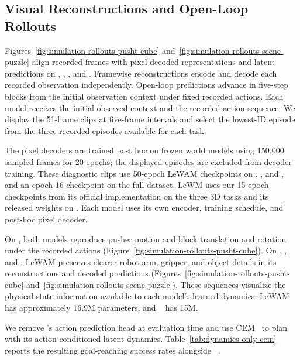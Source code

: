 \subsection{Visual Reconstructions and Open-Loop Rollouts}
\label{app:simulation-rollouts}

Figures~\ref{fig:simulation-rollouts-pusht-cube}
and~\ref{fig:simulation-rollouts-scene-puzzle} align recorded frames with
pixel-decoded representations and latent predictions on
, , , and .
Framewise reconstructions encode and decode each recorded observation independently. Open-loop predictions advance in five-step blocks from the initial observation context under fixed recorded actions. Each model receives the initial observed context and the recorded action sequence. We display the 51-frame clips at five-frame intervals and select the lowest-ID episode from the three recorded episodes available for each task.

The pixel decoders are trained post hoc on frozen world models using 150{,}000
sampled frames for 20 epochs; the displayed episodes are excluded from decoder
training. These diagnostic clips use 50-epoch LeWAM checkpoints on
, , and , and an epoch-16 checkpoint
on the full  dataset. LeWM uses our 15-epoch checkpoints from its
official implementation on the three 3D tasks and its released weights on
. Each model uses its own encoder, training schedule, and post-hoc pixel decoder.

On , both models reproduce pusher motion and block translation and rotation under the recorded actions (Figure~\ref{fig:simulation-rollouts-pusht-cube}). On , , and , LeWAM preserves clearer robot-arm, gripper, and object details in its reconstructions and decoded predictions (Figures~\ref{fig:simulation-rollouts-pusht-cube} and~\ref{fig:simulation-rollouts-scene-puzzle}). These sequences visualize the physical-state information available to each model's learned dynamics. LeWAM has approximately 16.9M parameters, and ~\citep{maes2026lewm} has 15M.

 We remove \method{}'s action prediction head at evaluation time and use CEM~\citep{rubinstein1999cem} to plan with its action-conditioned latent dynamics. Table~\ref{tab:dynamics-only-cem} reports the resulting goal-reaching success rates alongside ~\citep{maes2026lewm}.

